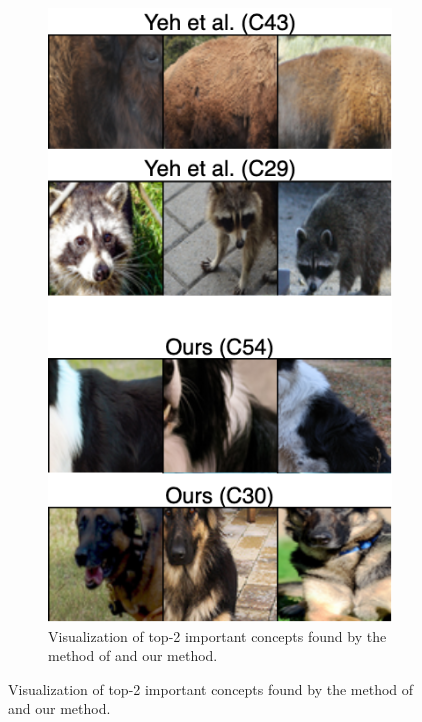 \begin{figure}[hbt]
\begin{subfigure}[b]{0.23\textwidth}
         \includegraphics[width=\textwidth]{figures/fig3c.png}
         \caption{\small Visualization of top-2 important concepts found by the method of \citet{yeh2020completeness} and our method.}
         \label{fig:collie-concepts}
     \end{subfigure}

\end{figure}

